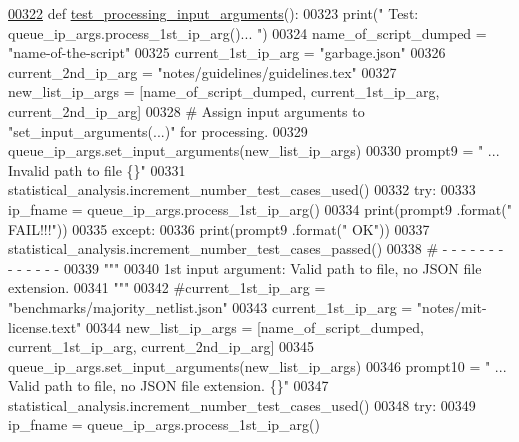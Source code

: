 \begin{DoxyCode}
\hypertarget{classutilities_1_1queue__ip__arguments__tester_1_1queue__ip__args__tester_l00322}{}\hyperlink{classutilities_1_1queue__ip__arguments__tester_1_1queue__ip__args__tester_a53e53ec2797918a6488b0d75ba437407}{00322}     \textcolor{keyword}{def }\hyperlink{classutilities_1_1queue__ip__arguments__tester_1_1queue__ip__args__tester_a53e53ec2797918a6488b0d75ba437407}{test\_processing\_input\_arguments}():
00323         print(\textcolor{stringliteral}{" Test: queue\_ip\_args.process\_1st\_ip\_arg()... "})
00324         name\_of\_script\_dumped = \textcolor{stringliteral}{"name-of-the-script"}
00325         current\_1st\_ip\_arg = \textcolor{stringliteral}{"garbage.json"}
00326         current\_2nd\_ip\_arg = \textcolor{stringliteral}{"notes/guidelines/guidelines.tex"}
00327         new\_list\_ip\_args = [name\_of\_script\_dumped, current\_1st\_ip\_arg, current\_2nd\_ip\_arg]
00328         \textcolor{comment}{#   Assign input arguments to "set\_input\_arguments(...)" for processing.}
00329         queue\_ip\_args.set\_input\_arguments(new\_list\_ip\_args)
00330         prompt9 = \textcolor{stringliteral}{" ... Invalid path to file    \{\}"}
00331         statistical\_analysis.increment\_number\_test\_cases\_used()
00332         \textcolor{keywordflow}{try}:
00333             ip\_fname = queue\_ip\_args.process\_1st\_ip\_arg()
00334             print(prompt9 .format(\textcolor{stringliteral}{"     FAIL!!!"}))
00335         \textcolor{keywordflow}{except}:
00336             print(prompt9 .format(\textcolor{stringliteral}{"         OK"}))
00337             statistical\_analysis.increment\_number\_test\_cases\_passed()
00338         \textcolor{comment}{#   -   -   -   -   -   -   -   -   -   -   -   -   -}
00339         \textcolor{stringliteral}{"""}
00340 \textcolor{stringliteral}{            1st input argument: Valid path to file, no JSON file extension.}
00341 \textcolor{stringliteral}{        """}
00342         \textcolor{comment}{#current\_1st\_ip\_arg = "benchmarks/majority\_netlist.json"}
00343         current\_1st\_ip\_arg = \textcolor{stringliteral}{"notes/mit-license.text"}
00344         new\_list\_ip\_args = [name\_of\_script\_dumped, current\_1st\_ip\_arg, current\_2nd\_ip\_arg]
00345         queue\_ip\_args.set\_input\_arguments(new\_list\_ip\_args)
00346         prompt10 = \textcolor{stringliteral}{"    ... Valid path to file, no JSON file extension. \{\}"}
00347         statistical\_analysis.increment\_number\_test\_cases\_used()
00348         \textcolor{keywordflow}{try}:
00349             ip\_fname = queue\_ip\_args.process\_1st\_ip\_arg()

\end{DoxyCode}
